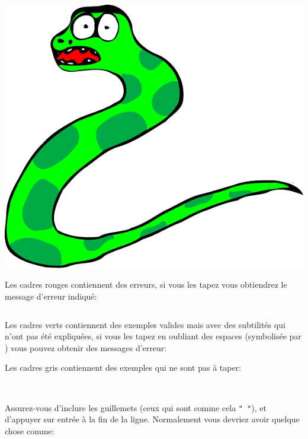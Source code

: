 \begin{center}
\includegraphics[scale=0.5]{images/serpent}
\end{center}

Les cadres rouges contiennent des erreurs, si vous les tapez vous obtiendrez le message d'erreur indiqué:

\begin{Verbatim}[frame=single,rulecolor=\color{red}, label=erreur]

\end{Verbatim}
Les cadres verts contiennent des exemples valides mais avec des subtilités qui n'ont pas été expliquées, si vous les tapez en oubliant des espaces (symbolisée par \verb*+ +) vous pouvez obtenir des messages d'erreur:

\begin{Verbatim*}[frame=single,rulecolor=\color{green}, label=à taper avec attention]
 
\end{Verbatim*}
Les cadres gris contiennent des exemples qui ne sont pas à taper:

\begin{Verbatim}[frame=single,rulecolor=\color{gray}, label=ne pas saisir]
 
\end{Verbatim}


Assurez-vous d'inclure les guillemets (ceux qui sont comme cela \texttt{" "}), et d'appuyer sur entrée à la fin de la ligne.
Normalement vous devriez avoir quelque chose comme:

